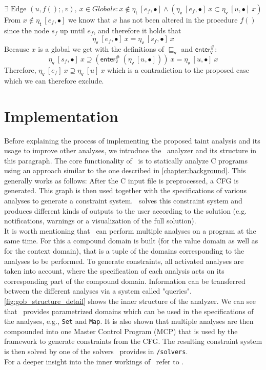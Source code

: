     \[\exists \text{ Edge }(u, f();, v),\ x \in Globals: x \notin \eta_\textsf{t}\ [e_f, \bullet] \land (\eta_\textsf{v}\ [e_f, \bullet]\ x\subset \eta_\textsf{v}\ [u, \bullet]\ x)\]
    From $x \notin \eta_\textsf{t}\ [e_f, \bullet]$ we know that $x$ has not been altered in the procedure $f()$ since the node $s_f$ up until $e_f$, and therefore it holds that 
    \[\eta_\textsf{v}\ [e_f, \bullet]\ x = \eta_\textsf{v}\ [s_f, \bullet]\ x\]
    Because $x$ is a global we get with the definitions of $\sqsubseteq_\textsf{v}$ and $\textsf{enter}^{\#}_\textsf{v}$: 
    \[\eta_\textsf{v}\ [s_f, \bullet]\ x \supseteq (\textsf{enter}^{\#}_\textsf{v}\ (\eta_\textsf{v}\ [u, \bullet]))\ x = \eta_\textsf{v}\ [u, \bullet]\ x\]
    Therefore, $\eta_\textsf{v}\ [e_f]\ x\supseteq \eta_\textsf{v}\ [u]\ x$ which is a contradiction to the proposed case which we can therefore exclude.

  \section{Implementation}
  Before explaining the process of implementing the proposed taint analysis and its usage to improve other analyses, we introduce the \gob\ analyzer and its structure in this paragraph. The core functionality of \gob\ is to statically analyze C programs using an approach similar to the one described in \autoref{chapter:background}. This generally works as follows: After the C input file is preprocessed, a \ac{CFG} is generated. This graph is then used together with the specifications of various analyses to generate a constraint system. \gob\ solves this constraint system and produces different kinds of outputs to the user according to the solution (e.g. notifications, warnings or a visualization of the full solution).\\
  It is worth mentioning that \gob\ can perform multiple analyses on a program at the same time. For this a compound domain is built (for the value domain as well as for the context domain), that is a tuple of the domains corresponding to the analyses to be performed. To generate constraints, all activated analyses are taken into account, where the specification of each analysis acts on its corresponding part of the compound domain. Information can be transferred between the different analyses via a system called "queries".\\
  \autoref{fig:gob_structure_detail} shows the inner structure of the analyzer. We can see that \gob\ provides parametrized domains which can be used in the specifications of the analyses, e.g., \texttt{Set} and \texttt{Map}. It is also shown that multiple analyses are then compounded into one Master Control Program (MCP) that is used by the framework to generate constraints from the \ac{CFG}. The resulting constraint system is then solved by one of the solvers \gob\ provides in \texttt{/solvers}.\\  
  For a deeper insight into the inner workings of \gob\ refer to \parencite{apinis2014frameworks}.
  

